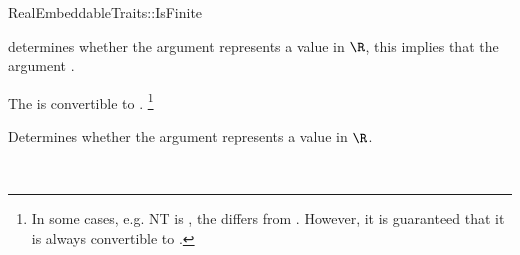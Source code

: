 \begin{ccRefConcept}{RealEmbeddableTraits::IsFinite}

\ccDefinition

 determines whether the argument represents 
a value in $\R$, this implies that the argument .

\ccRefines 


\ccTypes
{}
{}
{The  is convertible to . 
 \footnote{In some cases, e.g. NT is , the 
  differs from . 
 However, it is guaranteed that it is always convertible to .}
}\ccGlue
{}

\ccOperations
{}
        { Determines whether the argument represents a value in $\R$. }


\ccSeeAlso

\\

\end{ccRefConcept} 
